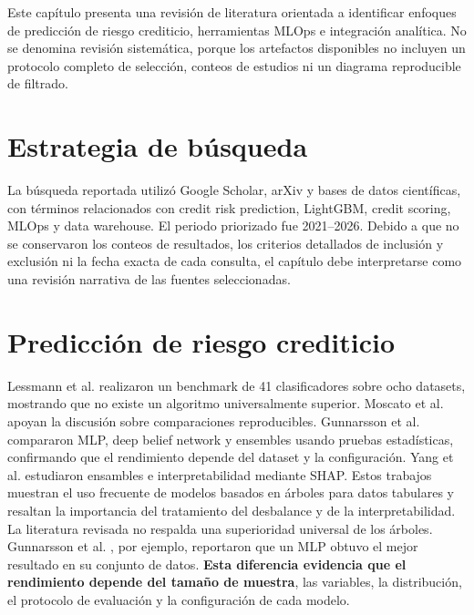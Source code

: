Este capítulo presenta una revisión de literatura orientada a identificar enfoques de predicción de riesgo crediticio, herramientas MLOps e integración analítica. No se denomina revisión sistemática, porque los artefactos disponibles no incluyen un protocolo completo de selección, conteos de estudios ni un diagrama reproducible de filtrado.

\section{Estrategia de búsqueda}

La búsqueda reportada utilizó Google Scholar, arXiv y bases de datos científicas, con términos relacionados con credit risk prediction, LightGBM, credit scoring, MLOps y data warehouse. El periodo priorizado fue 2021--2026. Debido a que no se conservaron los conteos de resultados, los criterios detallados de inclusión y exclusión ni la fecha exacta de cada consulta, el capítulo debe interpretarse como una revisión narrativa de las fuentes seleccionadas.

\section{Predicción de riesgo crediticio}

Lessmann et al. \cite{lessmann2015benchmarking} realizaron un benchmark de 41 clasificadores sobre ocho datasets, mostrando que no existe un algoritmo universalmente superior. Moscato et al. \cite{moscato2021benchmark} apoyan la discusión sobre comparaciones reproducibles. Gunnarsson et al. \cite{gunnarsson2021deep} compararon MLP, deep belief network y ensembles usando pruebas estadísticas, confirmando que el rendimiento depende del dataset y la configuración. Yang et al. \cite{chen2024interpretable} estudiaron ensambles e interpretabilidad mediante SHAP. Estos trabajos muestran el uso frecuente de modelos basados en árboles para datos tabulares y resaltan la importancia del tratamiento del desbalance y de la interpretabilidad.\\

La literatura revisada no respalda una superioridad universal de los árboles. Gunnarsson et al. \cite{gunnarsson2021deep}, por ejemplo, reportaron que un MLP obtuvo el mejor resultado en su conjunto de datos. \textbf{Esta diferencia evidencia que el rendimiento depende del tamaño de muestra}, las variables, la distribución, el protocolo de evaluación y la configuración de cada modelo.\\

